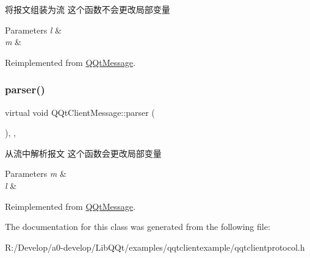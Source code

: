 将报文组装为流 这个函数不会更改局部变量 


\begin{DoxyParams}{Parameters}
{\em l} & \\
\hline
{\em m} & \\
\hline
\end{DoxyParams}


Reimplemented from \mbox{\hyperlink{class_q_qt_message_af1885c2c3628495808dca66ee8d72e14}{Q\+Qt\+Message}}.

\mbox{\label{class_q_qt_client_message_a79064773c134b5a0fba051b7b3f8c130}} 
\subsubsection{\texorpdfstring{parser()}{parser()}}
{\footnotesize\ttfamily virtual void Q\+Qt\+Client\+Message\+::parser (\begin{DoxyParamCaption}\item[{const Q\+Byte\+Array \&}]{ }\end{DoxyParamCaption})\hspace{0.3cm}{\ttfamily [inline]}, {\ttfamily [override]}, {\ttfamily [virtual]}}



从流中解析报文 这个函数会更改局部变量 


\begin{DoxyParams}{Parameters}
{\em m} & \\
\hline
{\em l} & \\
\hline
\end{DoxyParams}


Reimplemented from \mbox{\hyperlink{class_q_qt_message_a0bc25669bdd61490b1d8df6d77565f31}{Q\+Qt\+Message}}.



The documentation for this class was generated from the following file\+:\begin{DoxyCompactItemize}
\item 
R\+:/\+Develop/a0-\/develop/\+Lib\+Q\+Qt/examples/qqtclientexample/qqtclientprotocol.\+h\end{DoxyCompactItemize}
